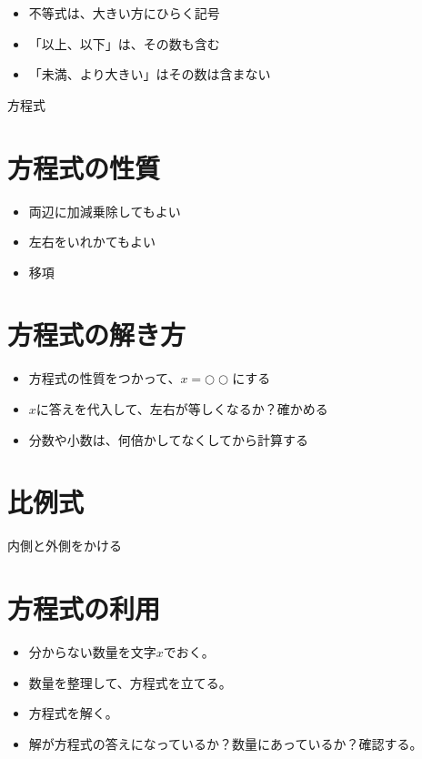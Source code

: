 \documentclass[11pt]{article}
\begin{document}
\begin{tcolorbox}[mybox={不等号に関する注意}]
\begin{itemize}
\item 不等式は、大きい方にひらく記号
\item 「以上、以下」は、その数も含む
\item 「未満、より大きい」はその数は含まない
\end{itemize}
\end{tcolorbox}

\newpage

{\LARGE \noindent 方程式}

\section{方程式の性質}
\begin{itemize}
\item 両辺に加減乗除してもよい
\item 左右をいれかてもよい
\item 移項
\end{itemize}

\section{方程式の解き方}
\begin{itemize}
\item 方程式の性質をつかって、$x=○○$にする
\item $x$に答えを代入して、左右が等しくなるか？確かめる
\item 分数や小数は、何倍かしてなくしてから計算する
\end{itemize}

\section{比例式}
内側と外側をかける

\section{方程式の利用}
\begin{itemize}
\item 分からない数量を文字$x$でおく。
\item 数量を整理して、方程式を立てる。
\item 方程式を解く。
\item 解が方程式の答えになっているか？数量にあっているか？確認する。
\end{itemize}
\end{document}
